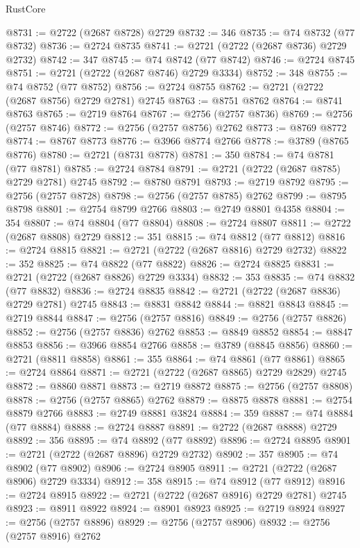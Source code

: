 \begin{lexlean}{RustCore}
\begin{coremodule}
@8731 := @2722 (@2687 @8728) @2729
@8732 := 346
@8735 := @74 @8732 (@77 @8732)
@8736 := @2724 @8735
@8741 := @2721 (@2722 (@2687 @8736) @2729 @2732)
@8742 := 347
@8745 := @74 @8742 (@77 @8742)
@8746 := @2724 @8745
@8751 := @2721 (@2722 (@2687 @8746) @2729 @3334)
@8752 := 348
@8755 := @74 @8752 (@77 @8752)
@8756 := @2724 @8755
@8762 := @2721 (@2722 (@2687 @8756) @2729 @2781) @2745
@8763 := @8751 @8762
@8764 := @8741 @8763
@8765 := @2719 @8764
@8767 := @2756 (@2757 @8736)
@8769 := @2756 (@2757 @8746)
@8772 := @2756 (@2757 @8756) @2762
@8773 := @8769 @8772
@8774 := @8767 @8773
@8776 := @3966 @8774 @2766
@8778 := @3789 (@8765 @8776)
@8780 := @2721 (@8731 @8778)
@8781 := 350
@8784 := @74 @8781 (@77 @8781)
@8785 := @2724 @8784
@8791 := @2721 (@2722 (@2687 @8785) @2729 @2781) @2745
@8792 := @8780 @8791
@8793 := @2719 @8792
@8795 := @2756 (@2757 @8728)
@8798 := @2756 (@2757 @8785) @2762
@8799 := @8795 @8798
@8801 := @2754 @8799 @2766
@8803 := @2749 @8801 @4358
@8804 := 354
@8807 := @74 @8804 (@77 @8804)
@8808 := @2724 @8807
@8811 := @2722 (@2687 @8808) @2729
@8812 := 351
@8815 := @74 @8812 (@77 @8812)
@8816 := @2724 @8815
@8821 := @2721 (@2722 (@2687 @8816) @2729 @2732)
@8822 := 352
@8825 := @74 @8822 (@77 @8822)
@8826 := @2724 @8825
@8831 := @2721 (@2722 (@2687 @8826) @2729 @3334)
@8832 := 353
@8835 := @74 @8832 (@77 @8832)
@8836 := @2724 @8835
@8842 := @2721 (@2722 (@2687 @8836) @2729 @2781) @2745
@8843 := @8831 @8842
@8844 := @8821 @8843
@8845 := @2719 @8844
@8847 := @2756 (@2757 @8816)
@8849 := @2756 (@2757 @8826)
@8852 := @2756 (@2757 @8836) @2762
@8853 := @8849 @8852
@8854 := @8847 @8853
@8856 := @3966 @8854 @2766
@8858 := @3789 (@8845 @8856)
@8860 := @2721 (@8811 @8858)
@8861 := 355
@8864 := @74 @8861 (@77 @8861)
@8865 := @2724 @8864
@8871 := @2721 (@2722 (@2687 @8865) @2729 @2829) @2745
@8872 := @8860 @8871
@8873 := @2719 @8872
@8875 := @2756 (@2757 @8808)
@8878 := @2756 (@2757 @8865) @2762
@8879 := @8875 @8878
@8881 := @2754 @8879 @2766
@8883 := @2749 @8881 @3824
@8884 := 359
@8887 := @74 @8884 (@77 @8884)
@8888 := @2724 @8887
@8891 := @2722 (@2687 @8888) @2729
@8892 := 356
@8895 := @74 @8892 (@77 @8892)
@8896 := @2724 @8895
@8901 := @2721 (@2722 (@2687 @8896) @2729 @2732)
@8902 := 357
@8905 := @74 @8902 (@77 @8902)
@8906 := @2724 @8905
@8911 := @2721 (@2722 (@2687 @8906) @2729 @3334)
@8912 := 358
@8915 := @74 @8912 (@77 @8912)
@8916 := @2724 @8915
@8922 := @2721 (@2722 (@2687 @8916) @2729 @2781) @2745
@8923 := @8911 @8922
@8924 := @8901 @8923
@8925 := @2719 @8924
@8927 := @2756 (@2757 @8896)
@8929 := @2756 (@2757 @8906)
@8932 := @2756 (@2757 @8916) @2762

\end{coremodule}
\end{lexlean}
